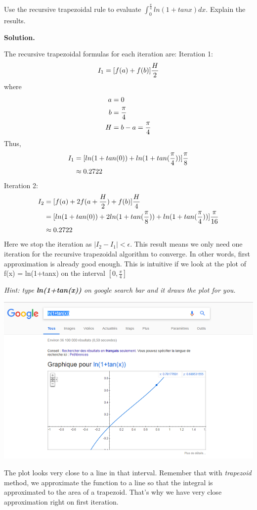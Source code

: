 \begin{exercise}{1} %
Use the recursive trapezoidal rule to evaluate $ \int_0^{\frac{\pi}{4}} ln(1 + tan x)dx.$ Explain the results.

\textbf{Solution.} 

The recursive trapezoidal formulas for each iteration are:
Iteration 1:
\begin{align}
I_1=[f(a)+f(b)]\frac{H}{2} \notag
\end{align}
where 
\begin{align}
a&=0 \notag \\
b&=\frac{\pi}{4} \notag \\
H&=b-a=\frac{\pi}{4} \notag \\
\end{align}
Thus,
\begin{align}
I_1&=[ln(1+tan(0))+ln(1+tan(\frac{\pi}{4}))]\frac{\pi}{8} \notag \\
&\approx 0.2722 \notag
\end{align}
Iteration 2:
\begin{align}
I_2&=[f(a)+2f(a+\frac{H}{2})+f(b)]\frac{H}{4} \notag \\
&=[ln(1+tan(0))+2ln(1+tan(\frac{\pi}{8}))+ln(1+tan(\frac{\pi}{4}))]\frac{\pi}{16} \notag \\
&\approx 0.2722 \notag
\end{align}
Here we stop the iteration as $\vert I_2 - I_1\vert < \epsilon$.
This result means we only need one iteration for the recursive trapezoidal algorithm to converge. In other words, first approximation is already good enough.
This is intuitive if we look at the plot of f(x) = ln(1+tanx) on the interval \([0,\frac{\pi}{4}]\)

\textit{Hint: type \textbf{ln(1+tan(x))} on google search bar and it draws the plot for you.}

\includegraphics[]{plot_ln(1+tanx).png}

The plot looks very close to a line in that interval. Remember that with \textit{trapezoid} method, we approximate the function to a line so that the integral is approximated to the area of a trapezoid. That's why we have very close approximation right on first iteration.
\end{exercise}

